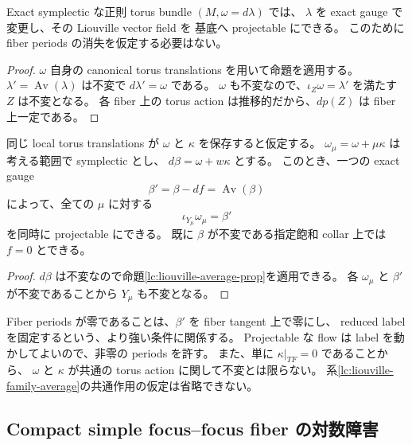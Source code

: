 \begin{corollary}
\label{lc:liouville-average-cor}
Exact symplectic な正則 torus bundle $(M,\omega=d\lambda)$ では、
$\lambda$ を exact gauge で変更し、その Liouville vector field を
基底へ projectable にできる。
このために fiber periods の消失を仮定する必要はない。
\end{corollary}

\begin{proof}
$\omega$ 自身の canonical torus translations を用いて命題を適用する。
$\lambda'=\operatorname{Av}(\lambda)$ は不変で $d\lambda'=\omega$ である。
$\omega$ も不変なので、$\iota_Z\omega=\lambda'$ を満たす $Z$ は不変となる。
各 fiber 上の torus action は推移的だから、$dp(Z)$ は fiber 上一定である。
\end{proof}

\begin{corollary}
\label{lc:liouville-family-average}
同じ local torus translations が $\omega$ と $\kappa$ を保存すると仮定する。
$\omega_\mu=\omega+\mu\kappa$ は考える範囲で symplectic とし、
$d\beta=\omega+w\kappa$ とする。
このとき、一つの exact gauge
\[
 \beta'=\beta-df=\operatorname{Av}(\beta)
\]
によって、全ての $\mu$ に対する
\[
 \iota_{Y_\mu}\omega_\mu=\beta'
\]
を同時に projectable にできる。
既に $\beta$ が不変である指定飽和 collar 上では $f=0$ とできる。
\end{corollary}

\begin{proof}
$d\beta$ は不変なので命題\ref{lc:liouville-average-prop}を適用できる。
各 $\omega_\mu$ と $\beta'$ が不変であることから $Y_\mu$ も不変となる。
\end{proof}

\begin{remark}
Fiber periods が零であることは、$\beta'$ を fiber tangent 上で零にし、
reduced label を固定するという、より強い条件に関係する。
Projectable な flow は label を動かしてよいので、非零の periods を許す。
また、単に $\kappa|_{TF}=0$ であることから、
$\omega$ と $\kappa$ が共通の torus action に関して不変とは限らない。
系\ref{lc:liouville-family-average}の共通作用の仮定は省略できない。
\end{remark}

\subsection{Compact simple focus--focus fiber の対数障害}
\label{lc:liouville-focus}

